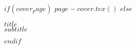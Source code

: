 

$if(cover_page)$
  $page-cover.tex()$
$else$

\begin{spacing}{2.0}
\noindent
{\huge {\MakeUppercase{$title$}}}\\
{\Large {$subtitle$}}
\end{spacing}

$endif$ %


